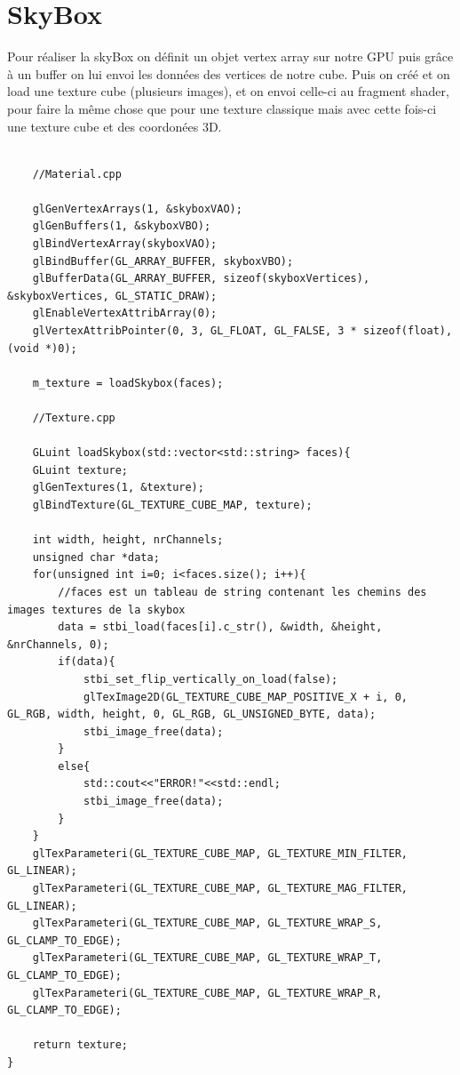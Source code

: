 \documentclass{article}
\begin{document}
\section{SkyBox}
Pour réaliser la skyBox on définit un objet vertex array sur notre GPU puis grâce à un buffer on lui envoi les données des vertices de notre cube.
Puis on créé et on load une texture cube (plusieurs images), et on envoi celle-ci au fragment shader, pour faire la même chose que pour une texture classique mais avec cette fois-ci une texture cube et des coordonées 3D.

\begin{lstlisting}

	//Material.cpp
	
	glGenVertexArrays(1, &skyboxVAO);
	glGenBuffers(1, &skyboxVBO);
	glBindVertexArray(skyboxVAO);
	glBindBuffer(GL_ARRAY_BUFFER, skyboxVBO);
	glBufferData(GL_ARRAY_BUFFER, sizeof(skyboxVertices), &skyboxVertices, GL_STATIC_DRAW);
	glEnableVertexAttribArray(0);
	glVertexAttribPointer(0, 3, GL_FLOAT, GL_FALSE, 3 * sizeof(float), (void *)0);

	m_texture = loadSkybox(faces);

	//Texture.cpp

	GLuint loadSkybox(std::vector<std::string> faces){
	GLuint texture;
	glGenTextures(1, &texture);
	glBindTexture(GL_TEXTURE_CUBE_MAP, texture);

	int width, height, nrChannels;
	unsigned char *data;
	for(unsigned int i=0; i<faces.size(); i++){
		//faces est un tableau de string contenant les chemins des images textures de la skybox 
		data = stbi_load(faces[i].c_str(), &width, &height, &nrChannels, 0);
		if(data){
			stbi_set_flip_vertically_on_load(false);
			glTexImage2D(GL_TEXTURE_CUBE_MAP_POSITIVE_X + i, 0, GL_RGB, width, height, 0, GL_RGB, GL_UNSIGNED_BYTE, data);
			stbi_image_free(data);
		}
		else{
			std::cout<<"ERROR!"<<std::endl;
			stbi_image_free(data);
		}
	}
	glTexParameteri(GL_TEXTURE_CUBE_MAP, GL_TEXTURE_MIN_FILTER, GL_LINEAR);
    glTexParameteri(GL_TEXTURE_CUBE_MAP, GL_TEXTURE_MAG_FILTER, GL_LINEAR);
    glTexParameteri(GL_TEXTURE_CUBE_MAP, GL_TEXTURE_WRAP_S, GL_CLAMP_TO_EDGE);
    glTexParameteri(GL_TEXTURE_CUBE_MAP, GL_TEXTURE_WRAP_T, GL_CLAMP_TO_EDGE);
    glTexParameteri(GL_TEXTURE_CUBE_MAP, GL_TEXTURE_WRAP_R, GL_CLAMP_TO_EDGE);

	return texture;
}

\end{lstlisting}
\end{document}
